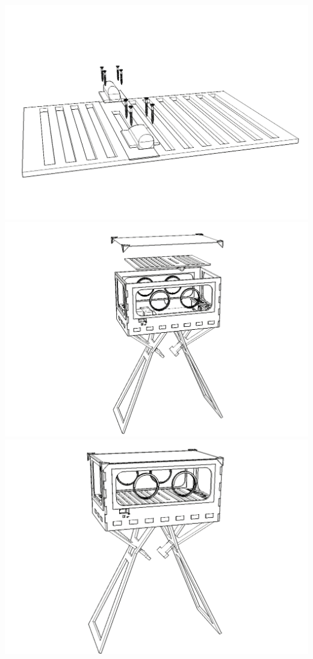 \documentclass{article}
\begin{document}
\begin{center}
	\includegraphics[width=\hsize]{assembling/step15.png}
	\includegraphics[width=\hsize]{assembling/step16.png}
	\includegraphics[width=\hsize]{assembling/result.png}
\end{center}
\end{document}
